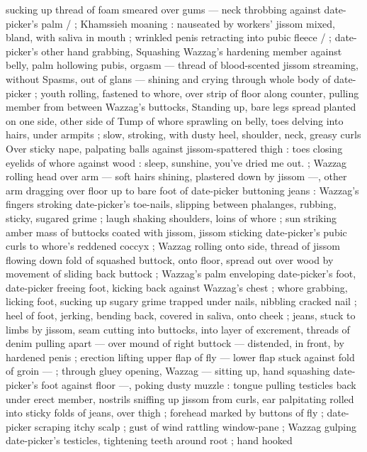 sucking up thread of foam smeared over gums --- neck throbbing 
against date-picker's palm {\slash} ; Khamssieh moaning : nauseated by 
workers' jissom mixed, bland, with saliva in mouth ; wrinkled penis 
retracting into pubic fleece {\slash} ; date-picker's other hand grabbing, 
Squashing Wazzag's hardening member against belly, palm hollowing 
pubis, orgasm --- thread of blood-scented jissom streaming, without 
Spasms, out of glans --- shining and crying through whole body of 
date-picker ; youth rolling, fastened to whore, over strip of floor 
along counter, pulling member from between Wazzag's buttocks, 
Standing up, bare legs spread planted on one side, other side of 
Tump of whore sprawling on belly, toes delving into hairs, under 
armpits ; slow, stroking, with dusty heel, shoulder, neck, greasy curls 
Over sticky nape, palpating balls against jissom-spattered thigh : 
toes closing eyelids of whore against wood : {\td} {\gl} sleep, sunshine, 
you've dried me out. {\gr} ; Wazzag rolling head over arm --- soft hairs 
shining, plastered down by jissom ---, other arm dragging over floor 
up to bare foot of date-picker buttoning jeans : Wazzag's fingers 
stroking date-picker's toe-nails, slipping between phalanges, 
rubbing, sticky, sugared grime ; laugh shaking shoulders, loins of 
whore ; sun striking amber mass of buttocks coated with jissom, 
jissom sticking date-picker's pubic curls to whore's reddened coccyx 
; Wazzag rolling onto side, thread of jissom flowing down fold of 
squashed buttock, onto floor, spread out over wood by movement of 
sliding back buttock ; Wazzag's palm enveloping date-picker's foot, 
date-picker freeing foot, kicking back against Wazzag's chest ; whore 
grabbing, licking foot, sucking up sugary grime trapped under nails, 
nibbling cracked nail ; heel of foot, jerking, bending back, covered in 
saliva, onto cheek ; jeans, stuck to limbs by jissom, seam cutting into 
buttocks, into layer of excrement, threads of denim pulling apart --- 
over mound of right buttock --- distended, in front, by hardened 
penis ; erection lifting upper flap of fly --- lower flap stuck against 
fold of groin --- ; through gluey opening, Wazzag --- sitting up, hand 
squashing date-picker's foot against floor ---, poking dusty muzzle : 
tongue pulling testicles back under erect member, nostrils sniffing up 
jissom from curls, ear palpitating rolled into sticky folds of jeans, 
over thigh ; forehead marked by buttons of fly ; date-picker scraping 
itchy scalp ; gust of wind rattling window-pane ; Wazzag gulping 
date-picker's testicles, tightening teeth around root ; hand hooked 
